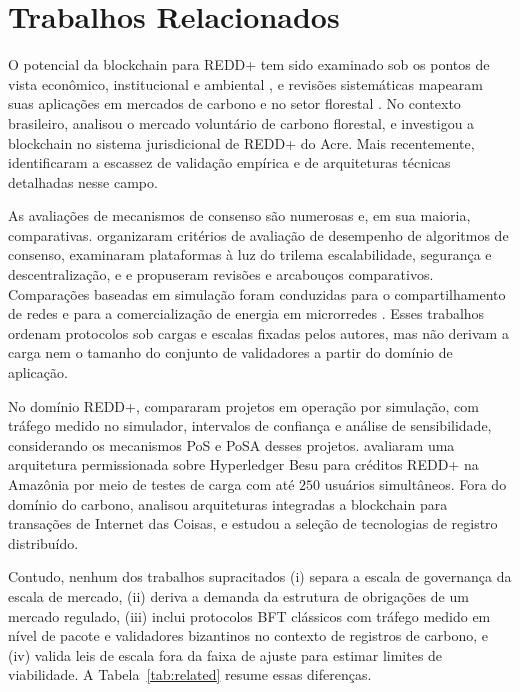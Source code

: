 \section{Trabalhos Relacionados}
\label{sec:related}

O potencial da blockchain para REDD+ tem sido examinado sob os pontos de vista econômico, institucional e ambiental \citep{Howson2019geoforum,Kotsialou2021,Kotsialou2022,Marke2022,Pak2021}, e revisões sistemáticas mapearam suas aplicações em mercados de carbono e no setor florestal \citep{Vilkov2023,He2022}. No contexto brasileiro, \citet{Aguiar2018} analisou o mercado voluntário de carbono florestal, e \citet{Neves2025} investigou a blockchain no sistema jurisdicional de REDD+ do Acre. Mais recentemente, \citet{Caburlao2026fsi} identificaram a escassez de validação empírica e de arquiteturas técnicas detalhadas nesse campo.

As avaliações de mecanismos de consenso são numerosas e, em sua maioria, comparativas. \citet{Bamakan2020} organizaram critérios de avaliação de desempenho de algoritmos de consenso, \citet{Werth2023} examinaram plataformas à luz do trilema escalabilidade, segurança e descentralização, e \citet{Shen2025} e \citet{Shaikh2025} propuseram revisões e arcabouços comparativos. Comparações baseadas em simulação foram conduzidas para o compartilhamento de redes \citep{Zeydan2026} e para a comercialização de energia em microrredes \citep{Bhavana2025}. Esses trabalhos ordenam protocolos sob cargas e escalas fixadas pelos autores, mas não derivam a carga nem o tamanho do conjunto de validadores a partir do domínio de aplicação.

No domínio REDD+, \citet{Caburlao2025reic,Caburlao2026clei} compararam projetos em operação por simulação, com tráfego medido no simulador, intervalos de confiança e análise de sensibilidade, considerando os mecanismos PoS e PoSA desses projetos. \citet{Bastos2026} avaliaram uma arquitetura permissionada sobre Hyperledger Besu para créditos REDD+ na Amazônia por meio de testes de carga com até $250$ usuários simultâneos. Fora do domínio do carbono, \citet{Rodrigues2021} analisou arquiteturas integradas a blockchain para transações de Internet das Coisas, e \citet{Rodrigues2024} estudou a seleção de tecnologias de registro distribuído.

Contudo, nenhum dos trabalhos supracitados (i) separa a escala de governança da escala de mercado, (ii) deriva a demanda da estrutura de obrigações de um mercado regulado, (iii) inclui protocolos BFT clássicos com tráfego medido em nível de pacote e validadores bizantinos no contexto de registros de carbono, e (iv) valida leis de escala fora da faixa de ajuste para estimar limites de viabilidade. A Tabela~\ref{tab:related} resume essas diferenças.

